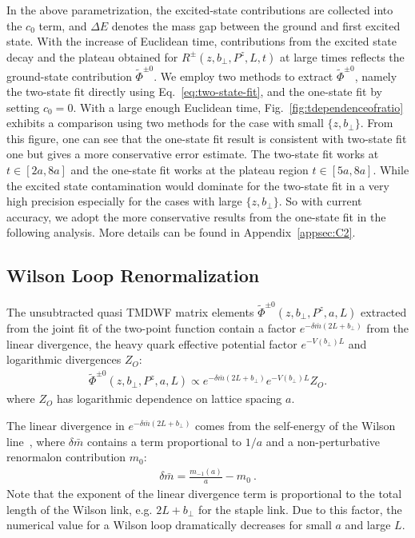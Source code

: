 \documentclass[prd,aps,twocolumn,preprintnumbers, showpacs, nofootinbib,superscriptaddress,notitlepage]{revtex4-1}
\begin{document}
 
In the above parametrization,  the excited-state contributions are collected into the $c_0$ term, and $\Delta E$ denotes the mass gap between the ground and first excited state.  With the increase of Euclidean time, contributions from the excited state decay and the plateau obtained for $R^{\pm}\left(z,b_{\perp},P^z,L,t \right)$ at large times reflects the ground-state contribution $\tilde{\Phi}^{\pm0}$. We employ two methods to extract $\tilde{\Phi}^{\pm0}$, namely the two-state fit directly using Eq.~\eqref{eq:two-state-fit}, and the one-state fit by setting $c_0=0$. With a large enough Euclidean time, Fig.~\ref{fig:tdependenceofratio} exhibits a comparison using two methods for the case with small $\{z,b_{\perp}\}$. From this figure, one can see that the one-state fit result is consistent with two-state fit one but gives  a more conservative error estimate. The two-state fit works at $t\in[2a, 8a]$ and the one-state fit works at the plateau region $t\in[5a, 8a]$. While the excited state contamination would dominate for the two-state fit in a very high precision especially for the cases with large $\{z, b_\perp\}$. So with current accuracy, we adopt the more conservative results from the one-state fit in the following analysis. More details can be found in Appendix~\ref{appsec:C2}.



\subsection{Wilson Loop Renormalization}
\label{subsec:numerical_wl}

The unsubtracted quasi TMDWF matrix elements $\tilde{\Phi}^{\pm0}\left(z,b_{\perp},P^z,a,L\right)$ extracted from the joint fit of the  two-point function contain a factor $e^{-\delta \bar{m}(2L+b_{\perp})}$ from the linear divergence, the heavy quark effective potential factor $e^{-V(b_{\perp})L}$ and logarithmic divergences $Z_{O}$:
\begin{align}
\tilde{\Phi}^{\pm0}\left(z,b_{\perp},P^z,a,L\right) \propto e^{-\delta \bar{m}(2L+b_{\perp})}e^{-V(b_{\perp})L}Z_{O}.
\end{align} 
where $Z_O$ has logarithmic dependence on lattice spacing $a$. 

The linear divergence in $e^{-\delta \bar{m}(2L+b_{\perp})}$ comes from the self-energy of the Wilson line~\cite{Ji:2017oey,Ishikawa:2017faj,Green:2017xeu, Ji:2020brr}, where $\delta\bar m$ contains a term  proportional to $1/a$  and a  non-perturbative renormalon contribution $m_{0}$:
\begin{align}
\delta\bar m = \frac{m_{-1}(a)}{a} - m_0  \ . 
\end{align}
Note that the exponent of the linear divergence term is proportional to the total length of the Wilson link, e.g. $2L+b_{\perp}$ for the staple link. Due to this factor,  the numerical value for a Wilson loop dramatically decreases  for small $a$ and large $L$. 
\end{document}
